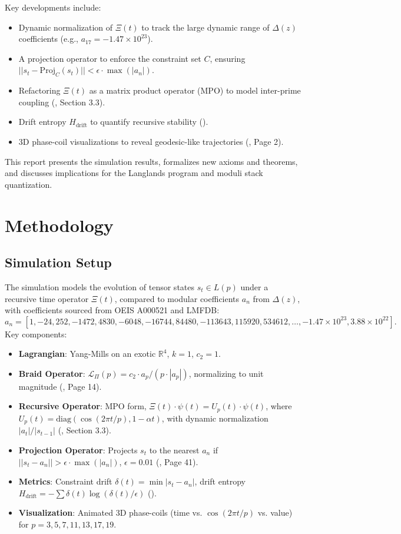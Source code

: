 \documentclass[11pt]{article}
\newcommand{\XiOp}{\Xi(t)}
\newcommand{\BraidOp}{\mathcal{L}_\Pi(p)}
\newcommand{\TensorState}{L(p)}
\newcommand{\Drift}{\delta(t)}
\newcommand{\Entropy}{H_{\text{drift}}}
\begin{document}
Key developments include:
\begin{itemize}
    \item Dynamic normalization of \( \XiOp \) to track the large dynamic range of \( \Delta(z) \) coefficients (e.g., \( a_{17} = -1.47 \times 10^{23} \)).
    \item A projection operator to enforce the constraint set \( C \), ensuring \( ||s_t - \text{Proj}_C(s_t)|| < \epsilon \cdot \max(|a_n|) \).
    \item Refactoring \( \XiOp \) as a matrix product operator (MPO) to model inter-prime coupling (\cite{Multiplicity}, Section 3.3).
    \item Drift entropy \( \Entropy \) to quantify recursive stability (\cite{LambdaArchivum}).
    \item 3D phase-coil visualizations to reveal geodesic-like trajectories (\cite{PrimeAdvancements9}, Page 2).
\end{itemize}

This report presents the simulation results, formalizes new axioms and theorems, and discusses implications for the Langlands program and moduli stack quantization.

\section{Methodology}
\subsection{Simulation Setup}
The simulation models the evolution of tensor states \( s_t \in \TensorState \) under a recursive time operator \( \XiOp \), compared to modular coefficients \( a_n \) from \( \Delta(z) \), with coefficients sourced from OEIS A000521 and LMFDB:
\[
a_n = [1, -24, 252, -1472, 4830, -6048, -16744, 84480, -113643, 115920, 534612, \ldots, -1.47 \times 10^{23}, 3.88 \times 10^{22}].
\]
Key components:
\begin{itemize}
    \item \textbf{Lagrangian}: Yang-Mills on an exotic \( \mathbb{R}^4 \), \( k=1 \), \( c_2 = 1 \).
    \item \textbf{Braid Operator}: \( \BraidOp = c_2 \cdot a_p / (p \cdot |a_p|) \), normalizing to unit magnitude (\cite{PrimeAdvancements9}, Page 14).
    \item \textbf{Recursive Operator}: MPO form, \( \XiOp \cdot \psi(t) = U_p(t) \cdot \psi(t) \), where \( U_p(t) = \text{diag}(\cos(2\pi t/p), 1 - \alpha t) \), with dynamic normalization \( |a_t| / |s_{t-1}| \) (\cite{Multiplicity}, Section 3.3).
    \item \textbf{Projection Operator}: Projects \( s_t \) to the nearest \( a_n \) if \( ||s_t - a_n|| > \epsilon \cdot \max(|a_n|) \), \( \epsilon = 0.01 \) (\cite{PrimeAdvancements9}, Page 41).
    \item \textbf{Metrics}: Constraint drift \( \Drift = \min |s_t - a_n| \), drift entropy \( \Entropy = -\sum \Drift \log(\Drift/\epsilon) \) (\cite{LambdaArchivum}).
    \item \textbf{Visualization}: Animated 3D phase-coils (time vs. \( \cos(2\pi t/p) \) vs. value) for \( p = 3, 5, 7, 11, 13, 17, 19 \).
\end{itemize}
\end{document}
